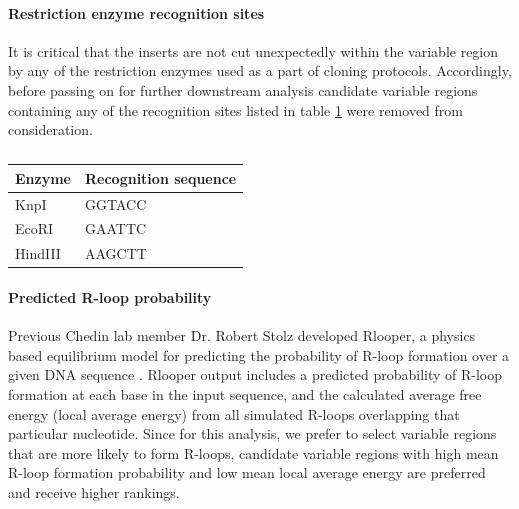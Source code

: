 \documentclass[11pt]{article}
\begin{document}
\paragraph{Restriction enzyme recognition sites}

It is critical that the inserts are not cut unexpectedly within the variable region by any of the restriction enzymes used as a part of cloning protocols. Accordingly, before passing on for further downstream analysis candidate variable regions containing any of the recognition sites listed in table \ref{tab:enzymes} were removed from consideration.

\begin{table}[H]
	\caption{}
	\label{tab:enzymes}
	\centering
	\begin{tabular}{@{}ll@{}}
		\toprule
		Enzyme  & Recognition sequence \\ \midrule
		KnpI    & GGTACC               \\
		EcoRI   & GAATTC               \\
		HindIII & AAGCTT               \\ \bottomrule
	\end{tabular}
\end{table}


\paragraph{Predicted R-loop probability}

Previous Chedin lab member Dr. Robert Stolz developed Rlooper, a physics based equilibrium model for predicting the probability of R-loop formation over a given DNA sequence \cite{Stolz2019}. Rlooper output includes a predicted probability of R-loop formation at each base in the input sequence, and the calculated average free energy (local average energy) from all simulated R-loops overlapping that particular nucleotide. Since for this analysis, we prefer to select variable regions that are more likely to form R-loops, candidate variable regions with high mean R-loop formation probability and low mean local average energy are preferred and receive higher rankings.
\end{document}
